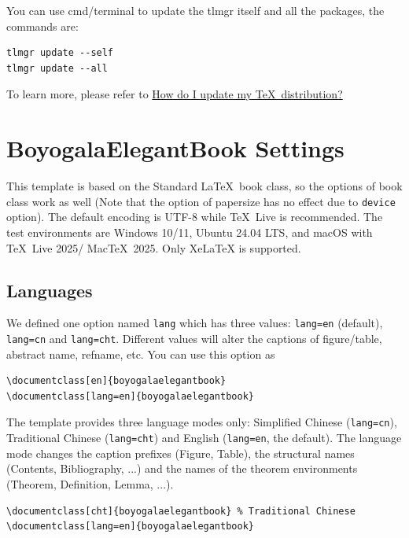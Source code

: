 \documentclass[11pt]{boyogalaelegantbook}
\begin{document}
You can use cmd/terminal to update the tlmgr itself and all the packages, the commands are:
\begin{lstlisting}
tlmgr update --self
tlmgr update --all
\end{lstlisting}

To learn more, please refer to \href{https://tex.stackexchange.com/questions/55437/how-do-i-update-my-tex-distribution}{How do I update my \TeX\ distribution?}

\chapter{BoyogalaElegantBook Settings}

This template is based on the Standard \LaTeX\ book class, so the options of book class work as well (Note that the option of papersize has no effect due to \lstinline{device} option). The default encoding is UTF-8 while \TeX~Live is recommended. The test environments are Windows 10/11, Ubuntu 24.04 LTS, and macOS with \TeX~Live 2025/ Mac\TeX\ 2025. Only \textsf{XeLaTeX} is supported.

\section{Languages}
We defined one option named \lstinline{lang} which has three values: \lstinline{lang=en} (default), \lstinline{lang=cn} and \lstinline{lang=cht}. Different values will alter the captions of figure/table, abstract name, refname, etc. You can use this option as

\begin{lstlisting}
\documentclass[en]{boyogalaelegantbook} 
\documentclass[lang=en]{boyogalaelegantbook}
\end{lstlisting}

The template provides three language modes only: Simplified Chinese
(\lstinline{lang=cn}), Traditional Chinese (\lstinline{lang=cht}) and English
(\lstinline{lang=en}, the default).  The language mode changes the caption
prefixes (Figure, Table), the structural names (Contents, Bibliography, ...)
and the names of the theorem environments (Theorem, Definition, Lemma, ...).

\begin{lstlisting}
\documentclass[cht]{boyogalaelegantbook} % Traditional Chinese
\documentclass[lang=en]{boyogalaelegantbook}
\end{lstlisting}
\end{document}
